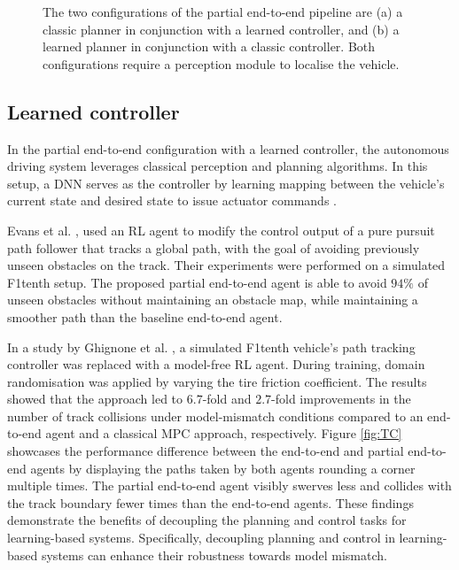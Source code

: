 \begin{figure}[htb!]
    \centering
    \begin{subfigure}[htb!]{\textwidth}
        \centering
        
        \caption[]{}
        \label{fig:pete_learned_control}
    \end{subfigure}
    \hfill
    \begin{subfigure}[htb!]{\textwidth}
        \centering
        
        \caption[]{}
        \label{fig:pete_learned_trajectory_planning}
    \end{subfigure}
\caption[Configurations of the partial end-to-end pipeline]{The two configurations of the partial end-to-end pipeline are (a) a classic planner in conjunction with a learned controller, and (b) a learned planner in conjunction with a classic controller. Both configurations require a perception module to localise the vehicle.}
\label{fig:pete}
\end{figure}



\subsection{Learned controller}
\label{sec:learned_controller}
In the partial end-to-end configuration with a learned controller, 
the autonomous driving system leverages classical perception and planning algorithms. 
In this setup, a DNN serves as the controller by learning mapping between the vehicle's current state and desired state to issue actuator commands \cite{Betz2021}.

Evans et al. \cite{Evans2021b}, used an RL agent to modify the control output of a pure pursuit path follower that tracks a global path, with the goal of avoiding previously unseen obstacles on the track.
Their experiments were performed on a simulated F1tenth setup.
The proposed partial end-to-end agent is able to avoid $94\%$ of unseen obstacles without maintaining an obstacle map, while maintaining a smoother path than the baseline end-to-end agent.

In a study by Ghignone et al. \cite{Ghignone2022}, a simulated F1tenth vehicle's path tracking controller was replaced with a model-free RL agent. 
During training, domain randomisation was applied by varying the tire friction coefficient. 
The results showed that the approach led to $6.7$-fold and $2.7$-fold improvements in the number of track collisions under model-mismatch conditions compared to an end-to-end agent and a classical MPC approach, respectively. 
Figure \ref{fig:TC} showcases the performance difference between the end-to-end and partial end-to-end agents by displaying the paths taken by both agents rounding a corner multiple times.
The partial end-to-end agent visibly swerves less and collides with the track boundary fewer times than the end-to-end agents.
These findings demonstrate the benefits of decoupling the planning and control tasks for learning-based systems. 
Specifically, decoupling planning and control in learning-based systems can enhance their robustness towards model mismatch.

